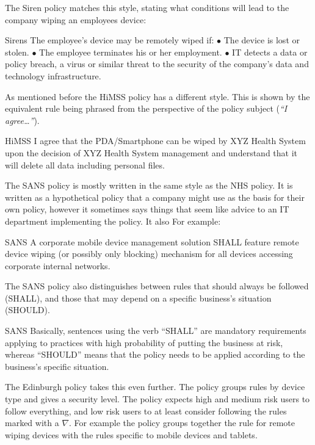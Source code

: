 \documentclass[thesis.tex]{subfiles}
\begin{document}
The Siren policy matches this style, stating what conditions will lead to the
company wiping an employees device:

\begin{policyrule}{Sirens}
The employee’s device may be remotely wiped if: $\bullet$ The device is lost or
stolen. $\bullet$ The employee terminates his or her employment. $\bullet$ IT
detects a data or policy breach, a virus or similar threat to the security of
the company’s data and technology infrastructure.
\end{policyrule}

As mentioned before the \ac{HiMSS} policy has a different style.  This is shown
by the equivalent rule being phrased from the perspective of the policy subject
(\emph{``I agree\dots''}).

\begin{policyrule}{HiMSS}
  I agree that the PDA/Smartphone can be wiped by XYZ Health System upon the
  decision of XYZ Health System management and understand that it will delete all
  data including personal files.
\end{policyrule}

The SANS policy is mostly written in the same style as the NHS policy.  It is
written as a hypothetical policy that a company might use as the basis for their
own policy, however it sometimes says things that seem like advice to an IT
department implementing the policy.  It also For example:

\begin{policyrule}{SANS}
   A corporate mobile device management solution SHALL feature remote device
   wiping (or possibly only blocking) mechanism for all devices accessing
   corporate internal networks.
\end{policyrule}

The SANS policy also distinguishes between rules that should always be followed (SHALL),
and those that may depend on a specific business's situation (SHOULD).

\begin{policyrule}{SANS}
  Basically, sentences using the verb ``SHALL'' are mandatory requirements
  applying to practices with high probability of putting the business at risk,
  whereas ``SHOULD'' means that the policy needs to be applied according to the
  business’s specific situation.
\end{policyrule}

The Edinburgh policy takes this even further. The policy groups rules by device type
and gives a security level.  The policy expects high and medium risk users
to follow everything, and low risk users to at least
consider following the rules marked with a $\nabla$.  For example the policy groups together the
rule for remote wiping devices with the rules specific to mobile
devices and tablets. 
\end{document}
